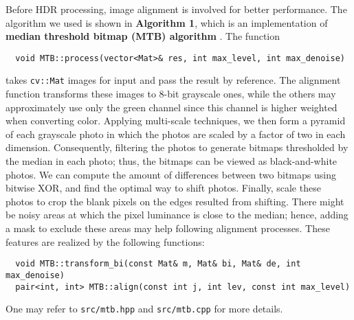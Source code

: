 Before HDR processing, image alignment is involved for better performance. The algorithm we used is shown in \textbf{Algorithm 1}, which is an implementation of \textbf{median threshold bitmap (MTB) algorithm} \cite{ref:Ward}. The function 

\begin{lstlisting}
  void MTB::process(vector<Mat>& res, int max_level, int max_denoise)
\end{lstlisting}

takes \texttt{cv::Mat} images for input and pass the result by reference. The alignment function transforms these images to 8-bit grayscale ones, while the others may approximately use only the green channel since this channel is higher weighted when converting color. Applying multi-scale techniques, we then form a pyramid of each grayscale photo in which the photos are scaled by a factor of two in each dimension. Consequently, filtering the photos to generate bitmaps thresholded by the median in each photo; thus, the bitmaps can be viewed as black-and-white photos. We can compute the amount of differences between two bitmaps using bitwise XOR, and find the optimal way to shift photos. Finally, scale these photos to crop the blank pixels on the edges resulted from shifting. There might be noisy areas at which the pixel luminance is close to the median; hence, adding a mask to exclude these areas may help following alignment processes. These features are realized by the following functions:

\begin{lstlisting}
  void MTB::transform_bi(const Mat& m, Mat& bi, Mat& de, int max_denoise)
  pair<int, int> MTB::align(const int j, int lev, const int max_level)
\end{lstlisting}

One may refer to \texttt{src/mtb.hpp} and \texttt{src/mtb.cpp} for more details. 

